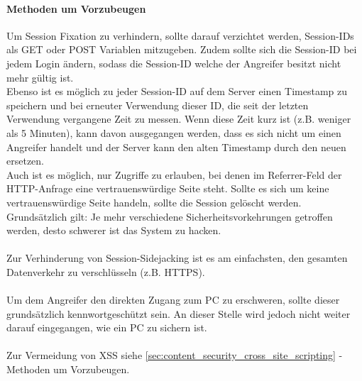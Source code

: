 \paragraph{Methoden um Vorzubeugen}
Um Session Fixation zu verhindern, sollte darauf verzichtet werden, Session-IDs als GET oder POST Variablen mitzugeben. Zudem sollte sich die Session-ID bei jedem Login ändern, sodass die Session-ID welche der Angreifer besitzt nicht mehr gültig ist.\\ Ebenso ist es möglich zu jeder Session-ID auf dem Server einen Timestamp zu speichern und bei erneuter Verwendung dieser ID, die seit der letzten Verwendung vergangene Zeit zu messen. Wenn diese Zeit kurz ist (z.B. weniger als 5 Minuten), kann davon ausgegangen werden, dass es sich nicht um einen Angreifer handelt und der Server kann den alten Timestamp durch den neuen ersetzen.\\ Auch ist es möglich, nur Zugriffe zu erlauben, bei denen im Referrer-Feld der HTTP-Anfrage eine vertrauenswürdige Seite steht. Sollte es sich um keine vertrauenswürdige Seite handeln, sollte die Session gelöscht werden.\\
Grundsätzlich gilt: Je mehr verschiedene Sicherheitsvorkehrungen getroffen werden, desto schwerer ist das System zu hacken.\\\\
Zur Verhinderung von Session-Sidejacking ist es am einfachsten, den gesamten Datenverkehr zu verschlüsseln (z.B. HTTPS). \\\\
Um dem Angreifer den direkten Zugang zum PC zu erschweren, sollte dieser grundsätzlich kennwortgeschützt sein. An dieser Stelle wird jedoch nicht weiter darauf eingegangen, wie ein PC zu sichern ist.\\\\
Zur Vermeidung von XSS siehe \autoref{sec:content_security_cross_site_scripting} -Methoden um Vorzubeugen.